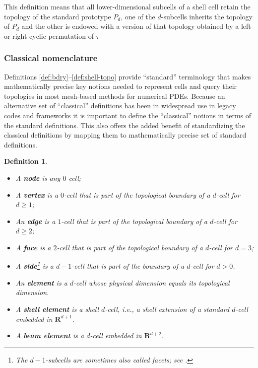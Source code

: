 \documentclass[pdf,12pt,relaxed]{SANDreport}
\newtheorem{defin}{Definition}
\begin{document}
    
    This definition means that all lower-dimensional subcells of a shell cell retain the topology of the standard prototype $P_d$, one of the $d$-subcells inherits the topology of $P_d$ and the other is endowed with a version of that topology obtained by a left or right cyclic permutation of $\tau$
    
    
    \subsubsection{Classical nomenclature}
    
           Definitions  \ref{def:bdry}--\ref{def:shell-topo} provide  ``standard'' terminology that 
makes mathematically precise key notions needed to represent cells and query their topologies in most mesh-based methods for numerical PDEs. Because an alternative set of  ``classical'' definitions has been in widespread use in legacy codes and frameworks it is important to define the ``classical'' notions  in terms of the standard definitions. This also offers the added benefit of standardizing the classical definitions by mapping them to mathematically precise set of standard definitions. 

\begin{defin}\label{def:classic}
$\ $
\begin{itemize}
\item A  \textbf{node} is any $0$-cell;
\item A \textbf{vertex} is a $0$-cell that is part of the topological boundary of a $d$-cell for $d\ge 1$;
\item An \textbf{edge} is a $1$-cell that is part of the topological boundary of a $d$-cell for $d\ge 2$;
\item A \textbf{face} is a  $2$-cell that is part of the topological boundary of a $d$-cell for $d = 3$;
\item A \textbf{side}\footnote{The $d-1$-subcells are sometimes also called facets; see \cite{math:polytope}.} is a $d-1$-cell that is part of the boundary of a $d$-cell for $d > 0$.
\item An \textbf{element} is a $d$-cell whose physical dimension equals its topological dimension.
\item A \textbf{shell element} is a shell $d$-cell, i.e., a shell extension of a standard $d$-cell embedded in $\mathbf{R}^{d+1}$.
\item A \textbf{beam element} is a $d$-cell embedded in $\mathbf{R}^{d+2}$.
\end{itemize}
\end{defin}
\end{document}
